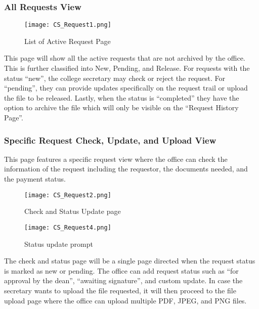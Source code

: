 \subsubsection{All Requests View}

\begin{figure}[h]
    \centering 
    \begin{minipage}[c]{0.5\linewidth}
        \centering
        \texttt{[image: CS\_Request1.png]}
        \caption{List of Active Request Page}
        \label{fig:CS_Request1}
    \end{minipage}
\end{figure}

This page will show all the active requests that are not archived by the office. This is further classified into New, Pending, and Release. For requests with the status “new”, the college secretary may check or reject the request. For “pending”, they can provide updates specifically on the request trail or upload the file to be released. Lastly, when the status is “completed”  they have the option to archive the file which will only be visible on the “Request History Page”.

\subsubsection{Specific Request Check, Update, and Upload View}

This page features a specific request view where the office can check the information of the request including the requestor, the documents needed, and the payment status.


\begin{figure}[h]
    \centering 
    \begin{minipage}[c]{0.5\linewidth}
        \centering
        \texttt{[image: CS\_Request2.png]}
        \caption{Check and Status Update page}
        \label{fig:CS_Request2}
    \end{minipage}\hfill
    \begin{minipage}[c]{0.5\linewidth}
        \centering
        \texttt{[image: CS\_Request4.png]}
        \caption{Status update prompt}
        \label{fig:CS_Request4}
    \end{minipage}
\end{figure}

The check and status page will be a single page directed when the request status is marked as new or pending. The office can add request status such as “for approval by the dean”, “awaiting signature”, and custom update. In case the secretary wants to upload the file requested, it will then proceed to the file upload page where the office can upload multiple PDF, JPEG, and PNG files.

